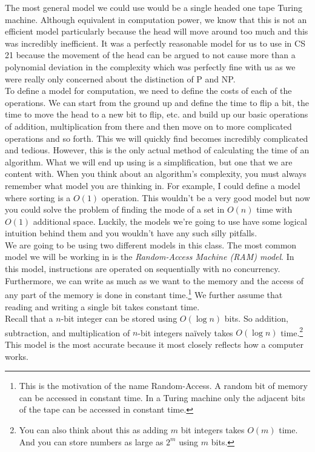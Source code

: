 \documentclass[11pt]{article}
\theoremstyle{plain}
\theoremstyle{definition}
\numberwithin{equation}{section}
\numberwithin{figure}{section}
\begin{document}
\noindent The most general model we could use would be a single headed one tape Turing machine. Although equivalent in computation power, we know that this is not an efficient model particularly because the head will move around too much and this was incredibly inefficient. It was a perfectly reasonable model for us to use in CS 21 because the movement of the head can be argued to not cause more than a polynomial deviation in the complexity which was perfectly fine with us as we were really only concerned about the distinction of P and NP. \\

\noindent To define a model for computation, we need to define the costs of each of the operations. We can start from the ground up and define the time to flip a bit, the time to move the head to a new bit to flip, etc. and build up our basic operations of addition, multiplication from there and then move on to more complicated operations and so forth. This we will quickly find becomes incredibly complicated and tedious. However, this is the only actual method of calculating the time of an algorithm. What we will end up using is a simplification, but one that we are content with. When you think about an algorithm's complexity, you must always remember what model you are thinking in. For example, I could define a model where sorting is a $O(1)$ operation. This wouldn't be a very good model but now you could solve the problem of finding the mode of a set in $O(n)$ time with $O(1)$ additional space. Luckily, the models we're going to use have some logical intuition behind them and you wouldn't have any such silly pitfalls. \\

\noindent We are going to be using two different models in this class. The most common model we will be working in is the \emph{Random-Access Machine (RAM) model}. In this model, instructions are operated on sequentially with no concurrency. Furthermore, we can write as much as we want to the memory and the access of any part of the memory is done in constant time.\footnote{This is the motivation of the name Random-Access. A random bit of memory can be accessed in constant time. In a Turing machine only the adjacent bits of the tape can be accessed in constant time.} We further assume that reading and writing a single bit takes constant time. \\

\noindent Recall that a $n$-bit integer can be stored using $O(\log n)$ bits. So addition, subtraction, and multiplication of $n$-bit integers na\"ively takes $O(\log n)$ time.\footnote{You can also think about this as adding $m$ bit integers takes $O(m)$ time. And you can store numbers as large as $2^m$ using $m$ bits.} This model is the most accurate because it most closely reflects how a computer works. \\
\end{document}
